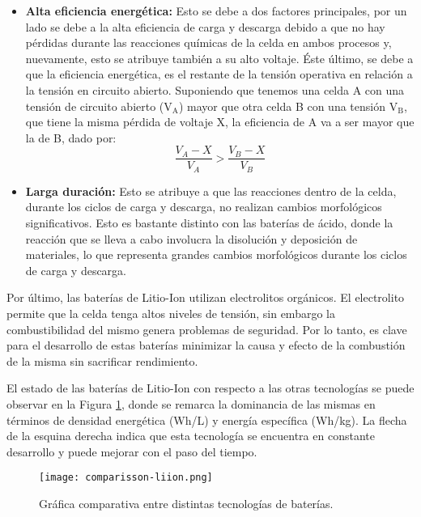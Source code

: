 \begin{itemize}
    destaquen a comparación de otras tecnologías, como por ejemplo, las celdas 
    de Niquel-metal con un voltaje de 1.2V pero con mayor capacidad tienen menor 
    energía específica. 
    \item \textbf{Alta eficiencia energética:} Esto se debe a dos 
	factores principales, por un lado se debe a la alta eficiencia de 
	carga y descarga debido a que no hay pérdidas durante las reacciones 
	químicas de la celda en ambos procesos y, nuevamente, esto se atribuye 
	también a su alto voltaje. Éste último, se debe a que la eficiencia 
	energética, es el restante de la tensión operativa en relación a la 
	tensión en circuito abierto. Suponiendo que tenemos una celda A con una 
	tensión de circuito abierto ($\mathrm{V_A}$) mayor que otra celda B con 
	una tensión $\mathrm{V_B}$, que tiene la misma pérdida de voltaje X, 
	la eficiencia de A va a ser mayor que la de B, dado por:
	\vspace{5mm}
	\begin{equation}
	    \frac{V_A - X}{V_A} > \frac{V_B - X}{V_B} \nonumber
	\end{equation}
    \newpage
    \item \textbf{Larga duración:} Esto se atribuye a que las reacciones 
	dentro de la celda, durante los ciclos de carga y descarga, no realizan 
	cambios morfológicos significativos. Esto es bastante distinto con las 
	baterías de ácido, donde la reacción que se lleva a cabo involucra la 
	disolución y deposición de materiales, lo que representa grandes 
	cambios morfológicos durante los ciclos de carga y descarga.
\end{itemize}

\noindent Por último, las baterías de Litio-Ion utilizan electrolitos orgánicos.
El electrolito permite que la celda tenga altos niveles de tensión, sin embargo
la combustibilidad del mismo genera problemas de seguridad. Por lo tanto, es
clave para el desarrollo de estas baterías minimizar la causa y efecto de la
combustión de la misma sin sacrificar rendimiento.

\noindent El estado de las baterías de Litio-Ion con respecto a las otras
tecnologías se puede observar en la Figura \ref{comparisson_batt}, donde se
remarca la dominancia de las mismas en términos de densidad energética (Wh/L) y 
energía específica (Wh/kg). La flecha de la esquina derecha indica que esta 
tecnología se encuentra en constante desarrollo y puede mejorar con el paso del 
tiempo.

\begin{figure}[h!]
    \begin{center}
	\texttt{[image: comparisson-liion.png]}
	\caption{Gr\'afica comparativa entre distintas tecnologías de baterías.}
	\label{comparisson_batt}
    \end{center}
\end{figure}

